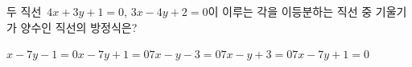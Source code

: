 두 직선~$4x+3y+1=0$, $3x-4y+2=0$이 이루는 각을 이등분하는 직선 중 기울기가 양수인 직선의 방정식은?
\begin{choicesii}{$x-7y-1=0$}{$x-7y+1=0$}{$7x-y-3=0$}{$7x-y+3=0$}{$7x-7y+1=0$}\end{choicesii}
